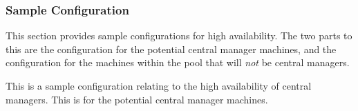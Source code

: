 \subsubsection{\label{sec:HA-sample-config} Sample Configuration} 
This section provides sample configurations for high availability.
The two parts to this are the 
configuration for the potential central manager machines,
and the configuration for the
machines within the pool that will \emph{not} be
central managers.

This is a sample configuration relating to the 
high availability of central managers.
This is for the potential central manager machines.

